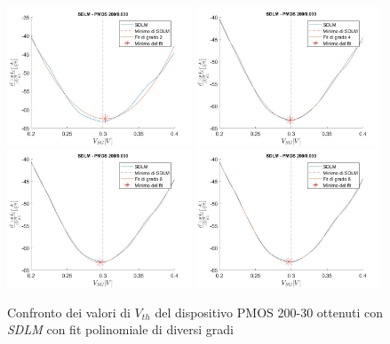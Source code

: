 \documentclass[12pt, letterpaper]{book}
\begin{document}
\begin{figure}[h!]
  \label{fig:GradiSDLM}
  \centering
  \includegraphics[width=0.49\textwidth]{SDLM-P1-200-30-grado2}
  \includegraphics[width=0.49\textwidth]{SDLM-P1-200-30-grado4}
  \includegraphics[width=0.49\textwidth]{SDLM-P1-200-30-grado6}
  \includegraphics[width=0.49\textwidth]{SDLM-P1-200-30-grado8}
  \caption{Confronto dei valori di $V_{th}$ del dispositivo PMOS 200-30 ottenuti con \emph{SDLM} con fit polinomiale di diversi gradi}
\end{figure}
\end{document}
